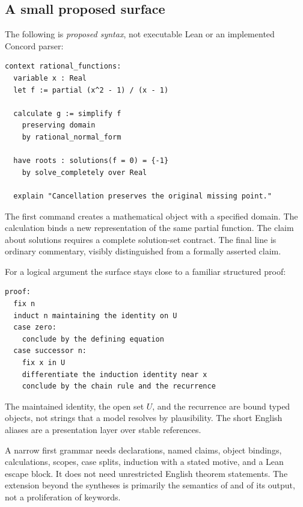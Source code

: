 \documentclass[11pt,a4paper]{article}
\newcommand{\code}[1]{\texttt{\detokenize{#1}}}
\theoremstyle{remark}
\begin{document}
\subsection{A small proposed surface}
The following is \emph{proposed syntax}, not executable Lean or an implemented
Concord parser:
\par\smallskip\noindent\begin{minipage}{\linewidth}
\begin{lstlisting}
context rational_functions:
  variable x : Real
  let f := partial (x^2 - 1) / (x - 1)

  calculate g := simplify f
    preserving domain
    by rational_normal_form

  have roots : solutions(f = 0) = {-1}
    by solve_completely over Real

  explain "Cancellation preserves the original missing point."
\end{lstlisting}
\end{minipage}\par\smallskip
The first command creates a mathematical object with a specified domain. The
calculation binds a new representation of the same partial function. The claim
about solutions requires a complete solution-set contract. The final line is
ordinary commentary, visibly distinguished from a formally asserted claim.

For a logical argument the surface stays close to a familiar structured proof:
\par\smallskip\noindent\begin{minipage}{\linewidth}
\begin{lstlisting}
proof:
  fix n
  induct n maintaining the identity on U
  case zero:
    conclude by the defining equation
  case successor n:
    fix x in U
    differentiate the induction identity near x
    conclude by the chain rule and the recurrence
\end{lstlisting}
\end{minipage}\par\smallskip
The maintained identity, the open set $U$, and the recurrence are bound typed
objects, not strings that a model resolves by plausibility. The short English
aliases are a presentation layer over stable references.

A narrow first grammar needs declarations, named claims, object bindings,
calculations, scopes, case splits, induction with a stated motive, and a Lean
escape block. It does not need unrestricted English theorem statements. The
extension beyond the syntheses is primarily the semantics of \code{calculate}
and of its output, not a proliferation of keywords.
\end{document}
